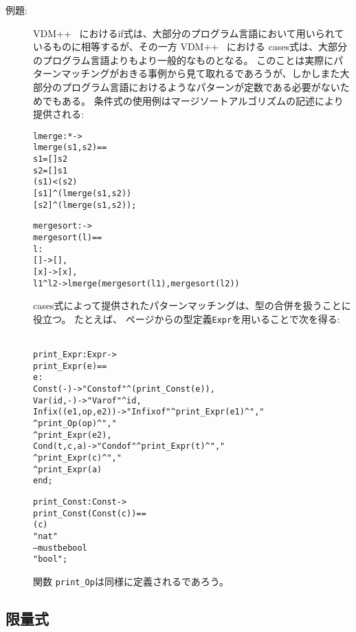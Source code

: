 \documentclass[\pformat,12pt]{jarticle}
\newcommand{\vdmslpp}[2]{%
#2
}
\newcommand{\vdmsl}{VDM-SL}
\newcommand{\vdmpp}{VDM++}
\begin{document}
\begin{description}
\item[例題:] 
 \vdmslpp{\vdmsl}{\vdmpp}\ におけるif式は、大部分のプログラム言語において用いられているものに相等するが、その一方 \vdmslpp{\vdmsl}{\vdmpp}\ における cases式は、大部分のプログラム言語よりもより一般的なものとなる。
このことは実際にパターンマッチングがおきる事例から見て取れるであろうが、しかしまた大部分のプログラム言語におけるようなパターンが定数である必要がないためでもある。
  条件式の使用例はマージソートアルゴリズムの記述により提供される:
  \begin{alltt}
  lmerge :  *  -> 
  lmerge (s1,s2) ==
     s1 = []  s2
     s2 = []  s1
     ( s1) < ( s2)
     [ s1]\verb+^+(lmerge ( s1, s2))
     [ s2]\verb+^+(lmerge (s1,  s2));

  mergesort :  -> 
  mergesort (l) ==
     l:
      [] -> [],
      [x] -> [x],
      l1\verb+^+l2 -> lmerge (mergesort(l1), mergesort(l2))
  \end{alltt}
cases式によって提供されたパターンマッチングは、型の合併を扱うことに役立つ。
たとえば、\pageref{exprdef} ページからの型定義\texttt{Expr}を用いることで次を得る:
  \begin{alltt}\label{printExprDef}
  print_Expr : Expr -> 
  print_Expr (e) ==
     e:
      Const(-) -> "Const of"\verb+^+(print_Const(e)),
      Var(id,-) -> "Var of"\verb+^+id,
      Infix((e1,op,e2)) -> "Infix of"\verb+^+print_Expr(e1)^","
                                      \verb+^+print_Op(op)\verb+^+","
                                      \verb+^+print_Expr(e2),
      Cond(t,c,a) -> "Cond of"\verb+^+print_Expr(t)\verb+^+","
                                 \verb+^+print_Expr(c)\verb+^+","
                                 \verb+^+print_Expr(a)
    end;

  print_Const : Const -> 
  print_Const(Const(c)) ==
     (c)
     "nat"
     -- must be bool
         "bool";
  \end{alltt}
  関数 \texttt{print\_Op}は同様に定義されるであろう。
\end{description}

\subsection{限量式}
\end{document}
